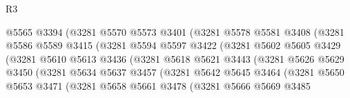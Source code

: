 \begin{lexlean}{R3}
\begin{coremodule}
                              @5565
                              @3394
                              (@3281
                                @5570
                                @5573
                                @3401
                                (@3281
                                  @5578
                                  @5581
                                  @3408
                                  (@3281
                                    @5586
                                    @5589
                                    @3415
                                    (@3281
                                      @5594
                                      @5597
                                      @3422
                                      (@3281
                                        @5602
                                        @5605
                                        @3429
                                        (@3281
                                          @5610
                                          @5613
                                          @3436
                                          (@3281
                                            @5618
                                            @5621
                                            @3443
                                            (@3281
                                              @5626
                                              @5629
                                              @3450
                                              (@3281
                                                @5634
                                                @5637
                                                @3457
                                                (@3281
                                                  @5642
                                                  @5645
                                                  @3464
                                                  (@3281
                                                    @5650
                                                    @5653
                                                    @3471
                                                    (@3281
                                                      @5658
                                                      @5661
                                                      @3478
                                                      (@3281
                                                        @5666
                                                        @5669
                                                        @3485

\end{coremodule}
\end{lexlean}
